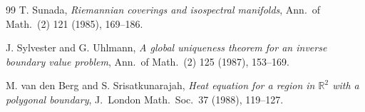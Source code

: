 \documentclass[11pt,reqno]{amsart}
\theoremstyle{plain}
\theoremstyle{definition}
\theoremstyle{remark}
\newcommand{\Reals}{\mathbb{R}}
\begin{document}
\begin{thebibliography}{99}
T. Sunada,
\emph{Riemannian coverings and isospectral manifolds},
Ann.\ of Math.\ (2) 121 (1985), 169--186.

J. Sylvester and G. Uhlmann,
\emph{A global uniqueness theorem for an inverse boundary value problem},
Ann.\ of Math.\ (2) 125 (1987), 153--169.

M. van den Berg and S. Srisatkunarajah,
\emph{Heat equation for a region in $\Reals^2$ with a polygonal boundary},
J.\ London Math.\ Soc.\ 37 (1988), 119--127.

\end{thebibliography}
\end{document}
